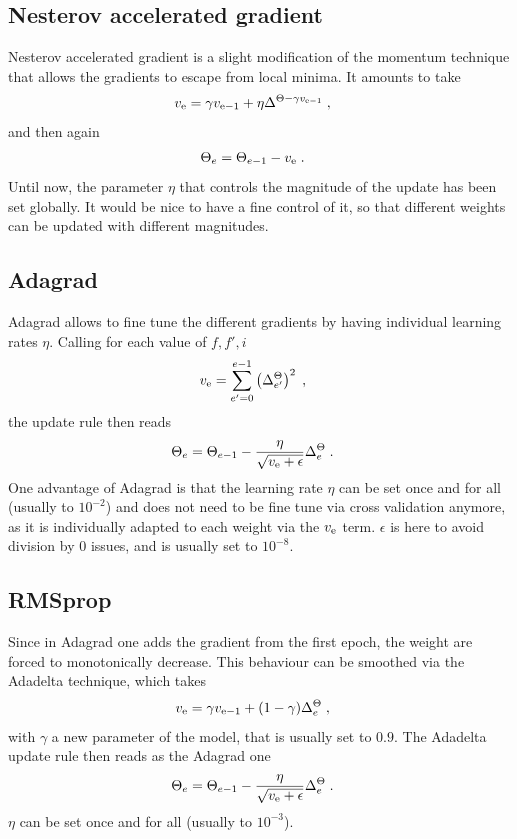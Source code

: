 \subsection{Nesterov accelerated gradient}

Nesterov accelerated gradient\cite{nesterov1983method} is a slight modification of the momentum technique that allows the gradients to escape from local minima. It amounts to take
\begin{align}
v_{{\rm e}}&=\gamma v_{{\rm e-1}}+\eta \Delta^{\Theta-\gamma v_{{\rm e-1}}}\;,
\end{align}
and then again
\begin{align}
\Theta_e&=\Theta_{e-1}-v_{{\rm e}}\;.
\end{align}
Until now, the parameter $\eta$ that controls the magnitude of the update has been set globally. It would be nice to have a fine control of it, so that different weights can be updated with different magnitudes.

\subsection{Adagrad}

Adagrad\cite{Duchi:2011:ASM:1953048.2021068} allows to fine tune the different gradients by having individual learning rates $\eta$. Calling for each value of $f,f',i$
\begin{align}
v_{{\rm e}}&=\sum_{e'=0}^{e-1} \left(\Delta^{\Theta}_{e'}\right)^2\;,
\end{align}
the update rule then reads
\begin{align}
\Theta_e&=\Theta_{e-1}-\frac{\eta}{\sqrt{v_{{\rm e}}+\epsilon}}\Delta^{\Theta}_{e}\;.
\end{align}
One advantage of Adagrad is that the learning rate $\eta$ can be set once and for all (usually to $10^{-2}$) and does not need to be fine tune via cross validation anymore, as it is individually adapted to each weight via the $v_{{\rm e}}$ term. $\epsilon$ is here to avoid division by 0 issues, and is usually set to $10^{-8}$.

\subsection{RMSprop}

Since in Adagrad one adds the gradient from the first epoch, the weight are forced to monotonically decrease. This behaviour can be smoothed via the Adadelta technique, which takes
\begin{align}
v_{{\rm e}}&=\gamma v_{{\rm e-1}}+(1-\gamma )\Delta^{\Theta}_{e}\;,
\end{align}
with $\gamma$ a new parameter of the model, that is usually set to $0.9$. The Adadelta update rule then reads as the Adagrad one
\begin{align}
\Theta_e&=\Theta_{e-1}-\frac{\eta}{\sqrt{v_{{\rm e}}+\epsilon}}\Delta^{\Theta}_{e}\;.
\end{align}
$\eta$ can be set once and for all (usually to $10^{-3}$).

